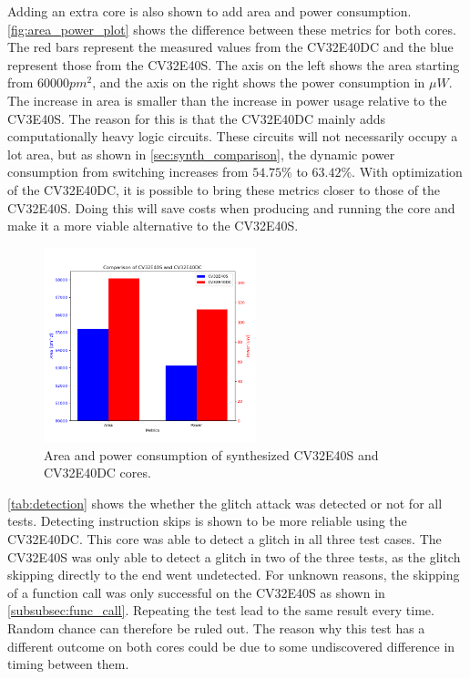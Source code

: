 Adding an extra core is also shown to add area and power consumption. \autoref{fig:area_power_plot} shows the difference between these metrics for both cores. The red bars represent the measured values from the CV32E40DC and the blue represent those from the CV32E40S. The axis on the left shows the area starting from 60000$pm^2$, and the axis on the right shows the power consumption in $\mu W$. The increase in area is smaller than the increase in power usage relative to the CV3E40S. The reason for this is that the CV32E40DC mainly adds computationally heavy logic circuits. These circuits will not necessarily occupy a lot area, but as shown in \autoref{sec:synth_comparison}, the dynamic power consumption from switching increases from $54.75\%$ to $63.42\%$. With optimization of the CV32E40DC, it is possible to bring these metrics closer to those of the CV32E40S. Doing this will save costs when producing and running the core and make it a more viable alternative to the CV32E40S. 

\begin{figure}[h!]
    \centering
    \includegraphics[width=0.55\textwidth]{docs/images/area_power_both_cores.png}
    \caption{Area and power consumption of synthesized CV32E40S and CV32E40DC cores. }
    \label{fig:area_power_plot}
\end{figure}

\autoref{tab:detection} shows the whether the glitch attack was detected or not for all tests. Detecting instruction skips is shown to be more reliable using the CV32E40DC. This core was able to detect a glitch in all three test cases. The CV32E40S was only able to detect a glitch in two of the three tests, as the glitch skipping directly to the end went undetected. For unknown reasons, the skipping of a function call was only successful on the CV32E40S as shown in \autoref{subsubsec:func_call}. Repeating the test lead to the same result every time. Random chance can therefore be ruled out. The reason why this test has a different outcome on both cores could be due to some undiscovered difference in timing between them.


